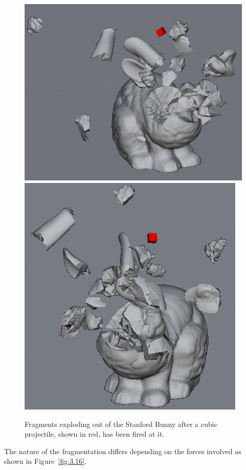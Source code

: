 \begin{figure}
\centerline{\includegraphics[scale=0.7]{voxel_exploded.png}\includegraphics[scale=0.686]{voxel_exploded2.png}}
\caption{Fragments exploding out of the Stanford Bunny after a cubic projectile, shown in red, has been fired at it.}
\label{fig:3.15}
\end{figure}

The nature of the fragmentation differs depending on the forces involved as shown in Figure~\ref{fig:3.16}.

